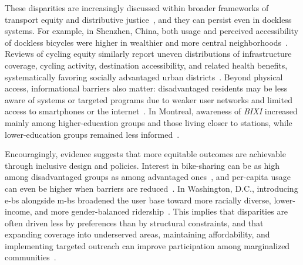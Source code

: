 These disparities are increasingly discussed within broader frameworks of transport equity and distributive justice~\cite{Cook2019, Litman2017, Pereira2017, Sheller2018}, and they can persist even in dockless systems. For example, in Shenzhen, China, both usage and perceived accessibility of dockless bicycles were higher in wealthier and more central neighborhoods~\cite{Zhou2024}. Reviews of cycling equity similarly report uneven distributions of infrastructure coverage, cycling activity, destination accessibility, and related health benefits, systematically favoring socially advantaged urban districts~\cite{Cunha2023}. Beyond physical access, informational barriers also matter: disadvantaged residents may be less aware of systems or targeted programs due to weaker user networks and limited access to smartphones or the internet~\cite{McNeil2018}. In Montreal, awareness of \textit{BIXI} increased mainly among higher-education groups and those living closer to stations, while lower-education groups remained less informed~\cite{Bernatchez2015}.

Encouragingly, evidence suggests that more equitable outcomes are achievable through inclusive design and policies. Interest in bike-sharing can be as high among disadvantaged groups as among advantaged ones~\cite{McNeil2018}, and per-capita usage can even be higher when barriers are reduced~\cite{Ogilvie2012}. In Washington, D.C., introducing \acp{e-b} alongside \acp{m-b} broadened the user base toward more racially diverse, lower-income, and more gender-balanced ridership~\cite{Bonilla-Alicea2020}. This implies that disparities are often driven less by preferences than by structural constraints, and that expanding coverage into underserved areas, maintaining affordability, and implementing targeted outreach can improve participation among marginalized communities~\cite{Goodman2014, McNeil2018, Ogilvie2012, Ursaki2015}.

